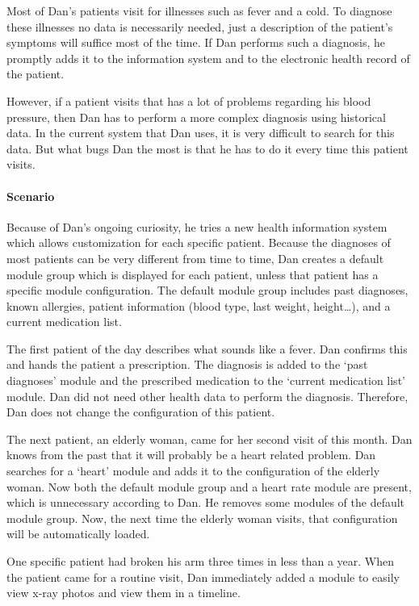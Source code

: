         Most of Dan's patients visit for illnesses such as fever and a cold. To diagnose these illnesses no data is necessarily needed, just a description of the patient's symptoms will suffice most of the time. If Dan performs such a diagnosis, he promptly adds it to the information system and to the electronic health record of the patient.

        However, if a patient visits that has a lot of problems regarding his blood pressure, then Dan has to perform a more complex diagnosis using historical data. In the current system that Dan uses, it is very difficult to search for this data. But what bugs Dan the most is that he has to do it every time this patient visits.

        \paragraph{Scenario} Because of Dan's ongoing curiosity, he tries a new health information system which allows customization for each specific patient. Because the diagnoses of most patients can be very different from time to time, Dan creates a default module group which is displayed for each patient, unless that patient has a specific module configuration. The default module group includes past diagnoses, known allergies, patient information (blood type, last weight, height\ldots), and a current medication list.

        The first patient of the day describes what sounds like a fever. Dan confirms this and hands the patient a prescription. The diagnosis is added to the `past diagnoses' module and the prescribed medication to the `current medication list' module. Dan did not need other health data to perform the diagnosis. Therefore, Dan does not change the configuration of this patient.

        The next patient, an elderly woman, came for her second visit of this month. Dan knows from the past that it will probably be a heart related problem. Dan searches for a `heart' module and adds it to the configuration of the elderly woman. Now both the default module group and a heart rate module are present, which is unnecessary according to Dan. He removes some modules of the default module group. Now, the next time the elderly woman visits, that configuration will be automatically loaded.

        One specific patient had broken his arm three times in less than a year. When the patient came for a routine visit, Dan immediately added a module to easily view x-ray photos and view them in a timeline.\\

